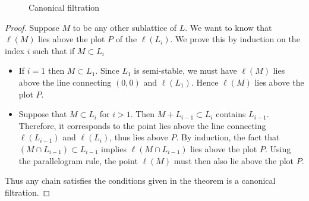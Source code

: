 \begin{figure}[ht]
    \centering
    \caption{Canonical filtration}
    \label{figure34}
\end{figure}
\begin{proof}
    Suppose $M$ to be any other sublattice of $L$. We want to know that $\ell(M)$ lies
    above the plot $P$ of the $\ell(L_i)$. We prove this by induction on the index $i$ such that if $M \subset L_i$
    \begin{itemize}
        \item If $i=1$ then $M\subset L_1$. Since $L_1 $ is semi-stable, we must have $\ell(M)$ lies above the line connecting $(0,0)$ and $\ell(L_1)$. Hence $\ell(M)$ lies above the plot $P$.
        \item Suppose that $M\subset L_i$ for $i>1$. Then $M+L_{i-1} \subset L_i$ contains $L_{i-1}$. Therefore, it corresponds to the point lies above the line connecting $\ell(L_{i-1})$ and $\ell(L_i)$, thus lies above $P$.         By induction, the fact that $(M\cap L_{i-1}) \subset L_{i-1}$ implies $\ell(M\cap L_{i-1})$ lies above the plot $P$. Using the parallelogram rule, the point $\ell(M)$ must then also lie above the plot $P$.
    \end{itemize}
    Thus any chain satisfies the conditions given in the theorem is a canonical filtration.
\end{proof}
